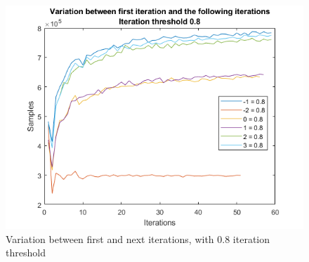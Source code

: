 \begin{figure}  %
  \centering
  \includegraphics[width=.7\textwidth]{figures/varfirst-0.8.png}
  \caption{Variation between first and next iterations, with 0.8 iteration threshold}
  \label{fig:iter:varfirst0.8}
\end{figure}

